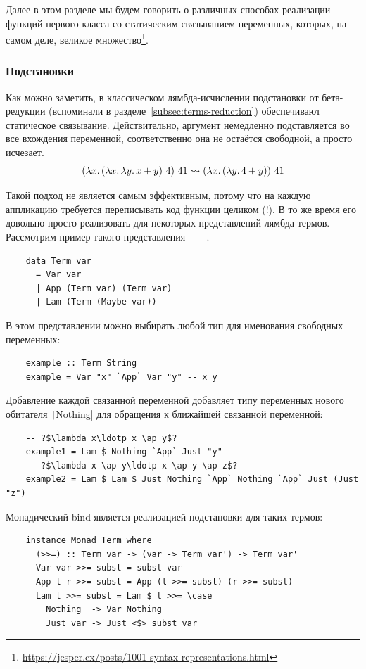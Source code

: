Далее в этом разделе мы будем говорить о различных способах реализации функций первого класса со статическим связыванием переменных, которых, на самом деле, великое множество\footnote{\url{https://jesper.cx/posts/1001-syntax-representations.html}}.

\subsubsection{Подстановки} \label{subsubsec:substitutions}

Как можно заметить, в классическом лямбда-исчислении подстановки от бета-редукции (вспоминали в разделе~\ref{subsec:terms-reduction}) обеспечивают статическое связывание.
Действительно, аргумент немедленно подставляется во все вхождения переменной, соответственно она не остаётся свободной, а просто исчезает.
\[
    (\lambda x\ldotp (\lambda x\ldotp \lambda y\ldotp x + y) ~ 4) ~ 41 \rightsquigarrow (\lambda x\ldotp (\lambda y\ldotp 4 + y)) ~ 41
\]

Такой подход не является самым эффективным, потому что на каждую аппликацию требуется переписывать код функции целиком (!).
В то же время его довольно просто реализовать для некоторых представлений лямбда-термов.
Рассмотрим пример такого представления --- ~\cite{chargueraud2012locally}.

\begin{verbatim}
    data Term var
      = Var var
      | App (Term var) (Term var)
      | Lam (Term (Maybe var))
\end{verbatim}

В этом представлении можно выбирать любой тип для именования свободных переменных:
\begin{verbatim}
    example :: Term String
    example = Var "x" `App` Var "y" -- x y
\end{verbatim}
Добавление каждой связанной переменной добавляет типу переменных нового обитателя \texttt|Nothing| для обращения к ближайшей связанной переменной:
\begin{verbatim}
    -- ?$\lambda x\ldotp x \ap y$?
    example1 = Lam $ Nothing `App` Just "y"
    -- ?$\lambda x \ap y\ldotp x \ap y \ap z$?
    example2 = Lam $ Lam $ Just Nothing `App` Nothing `App` Just (Just "z")
\end{verbatim}

Монадический bind является реализацией подстановки для таких термов:
\begin{verbatim}
    instance Monad Term where
      (>>=) :: Term var -> (var -> Term var') -> Term var'
      Var var >>= subst = subst var
      App l r >>= subst = App (l >>= subst) (r >>= subst)
      Lam t >>= subst = Lam $ t >>= \case
        Nothing  -> Var Nothing
        Just var -> Just <$> subst var
\end{verbatim}

